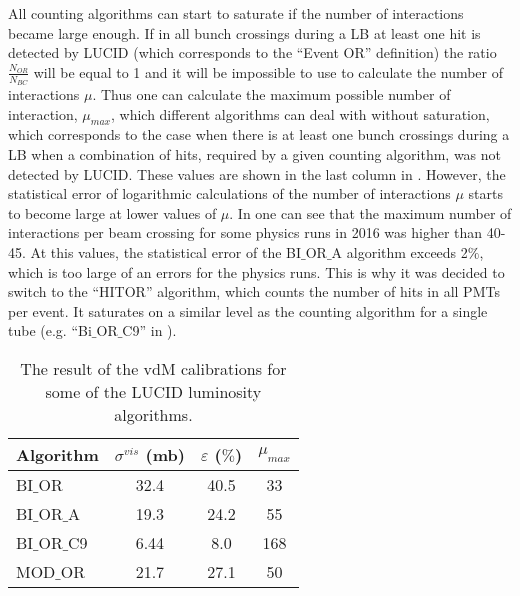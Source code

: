 % 
% 
All counting algorithms can start to saturate if the number of interactions became large enough.
If in all bunch crossings during a LB at least one hit is detected by LUCID (which corresponds to the ``Event OR'' definition) 
the ratio $\frac{N_{OR}}{N_{BC}}$ will be equal to 1 and it will be impossible to use  to calculate 
the number of interactions $\mu$. 
Thus one can calculate the maximum possible number of interaction,
$\mu_{max}$, which different algorithms can deal with without saturation, 
which corresponds to the case when there is at least one bunch crossings during a LB
when a combination of hits, required by a given counting algorithm, was not detected by LUCID.
These values are shown in the last column in .
However, the statistical error of logarithmic calculations of the number of interactions $\mu$ starts to become large at lower values of $\mu$.
In  one can see that the maximum number of interactions per beam crossing for some physics runs in 2016 was higher than 40-45. At this values, the statistical error of the BI$\_$OR$\_$A algorithm exceeds 2$\%$, which is too large of an errors for the physics runs.
This is why it was decided to switch to the ``HITOR'' algorithm, which counts the number of hits in all PMTs per event.
It saturates on a similar level as the counting algorithm for a single tube (e.g. ``Bi$\_$OR$\_$C9'' in ).

\begin{table}[p]
  \begin{tabular}{|l|c|c|c|}
    Algorithm & $\sigma^{vis}$ (mb) & $\varepsilon$ ($\%$) & $\mu_{max}$ \\
    \hline
    BI$\_$OR & 32.4 & 40.5 & 33 \\
    \hline
    BI$\_$OR$\_$A & 19.3 & 24.2 & 55 \\
    \hline
    BI$\_$OR$\_$C9 & 6.44 & 8.0 & 168 \\
    \hline
    MOD$\_$OR & 21.7 & 27.1 & 50 \\
  \end{tabular}
  \caption{The result of the vdM calibrations for some of the LUCID luminosity algorithms.}
  \label{tab:sigma_vis_efficiency}
\end{table}

